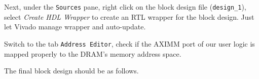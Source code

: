 \documentclass[11pt]{article}
\begin{document}
Next, under the \texttt{Sources} pane, right click on the block design file (\verb|design_1|), select \emph{Create HDL Wrapper} to create an RTL wrapper for the block design. Just let Vivado manage wrapper and auto-update.

\begin{center}
\end{center}

Switch to the tab \texttt{Address Editor}, check if the AXIMM port of our user logic is mapped properly to the DRAM's memory address space.

\begin{center}
\end{center}

The final block design should be as follows.

\begin{center}
\end{center}
\end{document}
